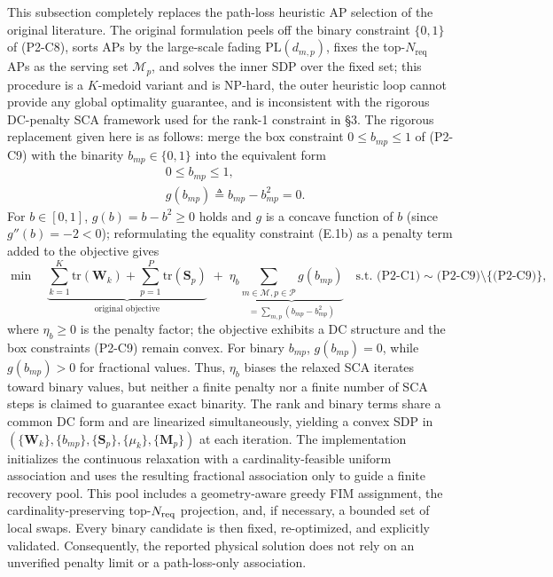 \documentclass[12pt,a4paper]{article}
\newcommand{\mat}[1]{\mathbf{#1}}
\newcommand{\tr}{\text{tr}}
\begin{document}
This subsection completely replaces the path-loss heuristic AP selection of the original literature. The original formulation peels off the binary constraint $\{0,1\}$ of (P2-C8), sorts APs by the large-scale fading $\text{PL}(d_{m,p})$, fixes the top-$N_{\text{req}}$ APs as the serving set $\mathcal{M}_p$, and solves the inner SDP over the fixed set; this procedure is a $K$-medoid variant and is NP-hard, the outer heuristic loop cannot provide any global optimality guarantee, and is inconsistent with the rigorous DC-penalty SCA framework used for the rank-1 constraint in \S3. The rigorous replacement given here is as follows: merge the box constraint $0 \leq b_{mp} \leq 1$ of (P2-C9) with the binarity $b_{mp} \in \{0,1\}$ into the equivalent form
\begin{subequations}\label{eq:b-rewrite}
\begin{align}
& 0 \leq b_{mp} \leq 1, \tag{E.1a} \\
& g(b_{mp}) \triangleq b_{mp} - b_{mp}^2 = 0. \tag{E.1b}
\end{align}
\end{subequations}
For $b \in [0,1]$, $g(b) = b - b^2 \geq 0$ holds and $g$ is a concave function of $b$ (since $g''(b) = -2 < 0$); reformulating the equality constraint (E.1b) as a penalty term added to the objective gives
\begin{equation}
\min \quad \underbrace{\sum_{k=1}^K \tr(\mat{W}_k) + \sum_{p=1}^P \tr(\mat{S}_p)}_{\text{original objective}} \; + \; \eta_b \underbrace{\sum_{m \in \mathcal{M}, p \in \mathcal{P}} g(b_{mp})}_{= \sum_{m,p} (b_{mp} - b_{mp}^2)} \quad \text{s.t. (P2-C1)} \sim \text{(P2-C9)} \setminus \{\text{(P2-C9)}\}, \tag{P2-DCP}
\end{equation}
where $\eta_b \geq 0$ is the penalty factor; the objective exhibits a DC structure and the box constraints (P2-C9) remain convex. For binary $b_{mp}$, $g(b_{mp})=0$, while $g(b_{mp})>0$ for fractional values. Thus, $\eta_b$ biases the relaxed SCA iterates toward binary values, but neither a finite penalty nor a finite number of SCA steps is claimed to guarantee exact binarity. The rank and binary terms share a common DC form and are linearized simultaneously, yielding a convex SDP in $(\{\mat{W}_k\},\{b_{mp}\},\{\mat{S}_p\},\{\mu_k\},\{\mat{M}_p\})$ at each iteration. The implementation initializes the continuous relaxation with a cardinality-feasible uniform association and uses the resulting fractional association only to guide a finite recovery pool. This pool includes a geometry-aware greedy FIM assignment, the cardinality-preserving top-$N_{\rm req}$ projection, and, if necessary, a bounded set of local swaps. Every binary candidate is then fixed, re-optimized, and explicitly validated. Consequently, the reported physical solution does not rely on an unverified penalty limit or a path-loss-only association.
\end{document}
